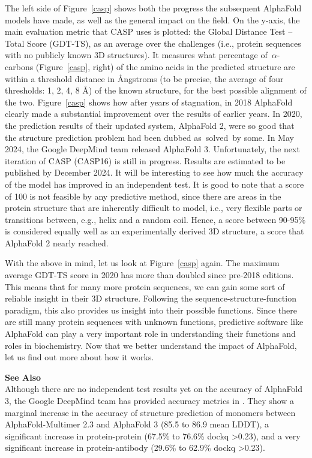 The left side of Figure~\ref{casp} shows both the progress the subsequent AlphaFold models have made, as well as the general impact on the field.
On the y-axis, the main evaluation metric that CASP uses is plotted: the Global Distance Test -- Total Score (GDT-TS), as an average over the challenges (i.e., protein sequences with no publicly known 3D structures).
It measures what percentage of~$\alpha$-carbons (Figure~\ref{casp}, right) of the amino acids in the predicted structure are within a threshold distance in Ångstroms (to be precise, the average of four thresholds: 1, 2, 4, 8 Å) of the known structure, for the best possible alignment of the two.
Figure~\ref{casp} shows how after years of stagnation, in 2018 AlphaFold clearly made a substantial improvement over the results of earlier years.
In 2020, the prediction results of their updated system, AlphaFold 2, were so good that the structure prediction problem had been dubbed as~solved~by some.
In May 2024, the Google DeepMind team released AlphaFold 3.
Unfortunately, the next iteration of CASP (CASP16) is still in progress.
Results are estimated to be published by December 2024.
It will be interesting to see how much the accuracy of the model has improved in an independent test.
It is good to note that a score of 100 is not feasible by any predictive method, since there are areas in the protein structure that are inherently difficult to model, i.e., very flexible parts or transitions between, e.g., helix and a random coil.
Hence, a score between 90-95\% is considered equally well as an experimentally derived 3D structure, a score that AlphaFold 2 nearly reached.

With the above in mind, let us look at Figure~\ref{casp} again.
The maximum average GDT-TS score in 2020 has more than doubled since pre-2018 editions.
This means that for many more protein sequences, we can gain some sort of reliable insight in their 3D structure.
Following the sequence-structure-function paradigm, this also provides us insight into their possible functions.
Since there are still many protein sequences with unknown functions, predictive software like AlphaFold can play a very important role in understanding their functions and roles in biochemistry.
Now that we better understand the impact of AlphaFold, let us find out more about how it works.

\begin{framed}
\textbf{See Also}\\
Although there are no independent test results yet on the accuracy of AlphaFold 3, the Google DeepMind team has provided accuracy metrics in \cite{alphafold3_approach_2024}.
They show a marginal increase in the accuracy of structure prediction of monomers between AlphaFold-Multimer 2.3 and AlphaFold 3 (85.5 to 86.9 mean LDDT), a significant increase in protein-protein (67.5\% to 76.6\% dockq \textgreater  0.23), and a very significant increase in protein-antibody (29.6\% to 62.9\% dockq \textgreater  0.23).
\end{framed}


